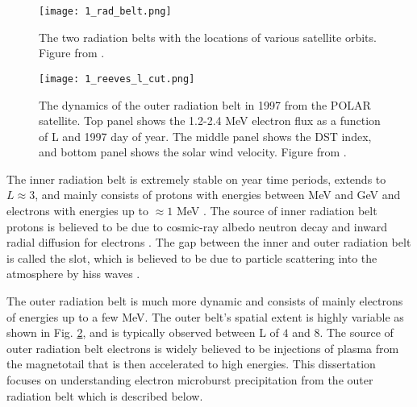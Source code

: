 \begin{figure}
\texttt{[image: 1\_rad\_belt.png]}
\caption{The two radiation belts with the locations of various satellite orbits. Figure from \citep{Horne2013}.}
\label{Intro:rad_belts}
\end{figure}

\begin{figure}
\texttt{[image: 1\_reeves\_l\_cut.png]}
\caption{The dynamics of the outer radiation belt in 1997 from the POLAR satellite. Top panel shows the 1.2-2.4 MeV electron flux as a function of L and 1997 day of year. The middle panel shows the DST index, and bottom panel shows the solar wind velocity. Figure from \citep{Reeves2003}.}
\label{Intro:reeves_l_cut}
\end{figure}

The inner radiation belt is extremely stable on year time periods, extends to $L \approx 3$, and mainly consists of protons with energies between MeV and GeV and electrons with energies up to $\approx 1$ MeV \citep{Claudepierre2019}. The source of inner radiation belt protons is believed to be due to cosmic-ray albedo neutron decay \citep[e.g.][]{Li2017_CRAND} and inward radial diffusion for electrons \citep[e.g.][]{O'Brien2016_inner}. The gap between the inner and outer radiation belt is called the slot, which is believed to be due to particle scattering into the atmosphere by hiss waves \citep[e.g.][]{Lyons1973, Breneman2015}.

The outer radiation belt is much more dynamic and consists of mainly electrons of energies up to a few MeV. The outer belt's spatial extent is highly variable as shown in Fig. \ref{Intro:reeves_l_cut}, and is typically observed between L of $4$ and $8$. The source of outer radiation belt electrons is widely believed to be injections of plasma from the magnetotail that is then accelerated to high energies. This dissertation focuses on understanding electron microburst precipitation from the outer radiation belt which is described below.

